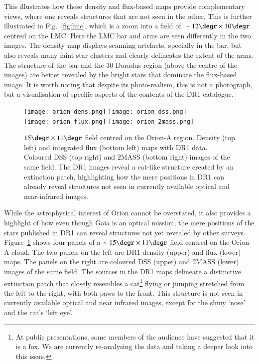 \documentclass[longauth, final]{aa}
\begin{document}
This illustrates how these density and flux-based maps provide complementary views, where one reveals structures that are not seen in the other. This is further illustrated in Fig.~\ref{fig:lmc}, which is a zoom into a field of $~\sim 12\degr\times 10\degr$ centred on the LMC. Here the LMC bar and arms are seen differently in the two images. The density map displays scanning artefacts, specially in the bar, but also reveals many faint star clusters and clearly delineates the extent of the arms.  The structure of the bar and the 30 Doradus region (above the centre of the images) are better revealed by the bright stars that dominate the flux-based image. It is worth noting that despite its photo-realism, this is not a photograph, but a visualisation of specific aspects of the contents of the DR1 catalogue. 


\begin{figure*}[!htbp]
\centering
    \texttt{[image: orion\_dens.png]}
    \texttt{[image: orion\_dss.png]}\\
    \texttt{[image: orion\_flux.png]}
    \texttt{[image: orion\_2mass.png]}
  \caption{$15\degr\times 11\degr$ field centred on the Orion-A region. Density (top left) and integrated flux (bottom left) maps with DR1 data. Coloured DSS (top right) and 2MASS (bottom right) images of the same field. The DR1 images reveal a cat-like structure created by an extinction patch, highlighting how the mere positions in DR1 can already reveal structures not seen in currently available optical and near-infrared images.}\label{fig:orion}
\end{figure*}

While the astrophysical interest of Orion cannot be overstated, it also provides a highlight of how even though Gaia is an optical mission, the mere positions of the stars published in DR1 can reveal structures not yet revealed by other surveys. Figure~\ref{fig:orion} shows four panels of a $\sim 15\degr\times 11\degr$ field centred on the Orion-A cloud. The two panels on the left are DR1 density (upper) and flux (lower) maps. The panels on the right are coloured  DSS (upper) and 2MASS (lower) images of the same field. The sources in the DR1 maps delineate a distinctive extinction patch that closely resembles a cat\footnote{At public presentations, some members of the audience have suggested that it is a fox. We are currently re-analysing the data and taking a deeper look into this issue.} flying or jumping stretched from the left to the right, with both paws to the front. This structure is not seen in currently available optical and near infrared images, except for the shiny `nose' and the cat's `left eye'.
\end{document}
